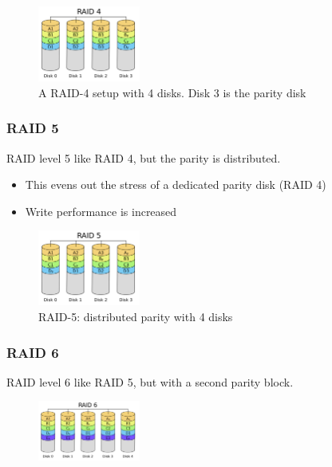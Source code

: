\documentclass{article}
\begin{document}
\begin{figure}[H]
    \centering
    \includegraphics[width=0.3\textwidth]{raid-4.png}
    \caption{A RAID-4 setup with 4 disks. Disk 3 is the parity disk}
\end{figure}


\subsubsection{RAID 5}

RAID level 5 like RAID 4, but the parity is distributed.

\begin{itemize}
    \item This evens out the stress of a dedicated parity disk (RAID 4)
    \item Write performance is increased
\end{itemize}

\begin{figure}[H]
    \centering
    \includegraphics[width=0.3\textwidth]{raid-5.png}
    \caption{RAID-5: distributed parity with 4 disks}
\end{figure}


\subsubsection{RAID 6}

RAID level 6 like RAID 5, but with a second parity block.

\begin{figure}[H]
    \centering
    \includegraphics[width=0.3\textwidth]{raid-6.png}
\end{figure}
\end{document}
